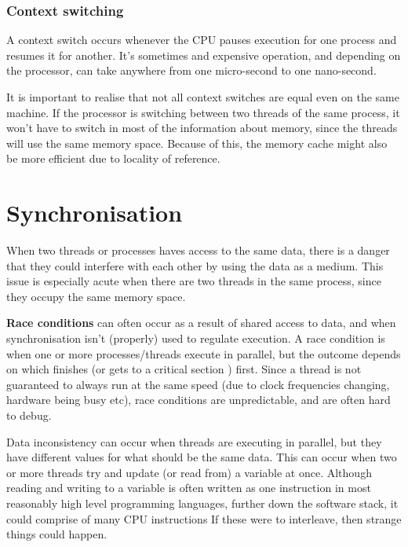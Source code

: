\subsubsection{Context switching}

A context switch occurs whenever the CPU pauses execution for one process and
resumes it for another. It's sometimes and expensive operation, and depending on
the processor, can take anywhere from one micro-second to one nano-second.


It is important to realise that not all context switches are equal even on the
same machine. If the processor is switching between two threads of the same
process, it won't have to switch in most of the information about memory, since
the threads will use the same memory space. Because of this, the memory cache
might also be more efficient due to locality of reference.

\section{Synchronisation}

When two threads or processes haves access to the same data, there is a danger
that they could interfere with each other by using the data as a medium. This
issue is especially acute when there are two threads in the same process, since
they occupy the same memory space.

\textbf{Race conditions} can often occur as a result of shared access to data,
and when synchronisation isn't (properly) used to regulate execution. A race
condition is when one or more processes/threads execute in parallel, but the
outcome depends on which finishes (or gets to a critical section ) first. Since a thread is not guaranteed to always run at the same speed
(due to clock frequencies changing, hardware being busy etc), race conditions
are unpredictable, and are often hard to debug.

Data inconsistency can occur when threads are executing in parallel, but they
have different values for what should be the same data. This can occur when two
or more threads try and update (or read from) a variable at once. Although
reading and writing to a variable is often written as one instruction in most
reasonably high level programming languages, further down the software stack, it
could comprise of many CPU instructions If these were to interleave, then strange
things could happen.

